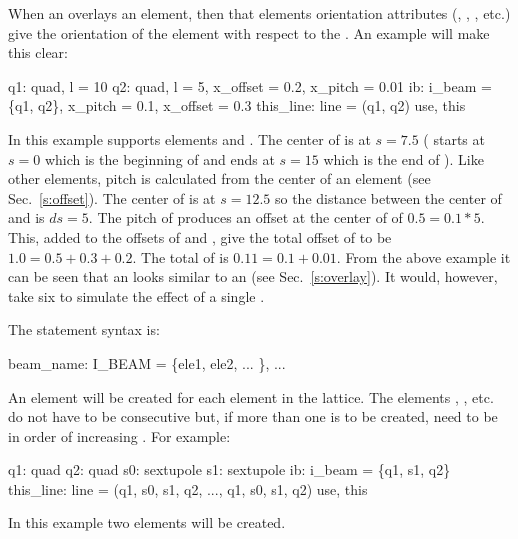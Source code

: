 When an  overlays an element, then that elements
orientation attributes (, , , etc.) 
give the orientation of
the element with respect to the . An example will make this clear:
\begin{example}
  q1: quad, l = 10
  q2: quad, l = 5, x_offset = 0.2, x_pitch = 0.01
  ib: i_beam = \{q1, q2\}, x_pitch = 0.1, x_offset = 0.3
  this_line: line = (q1, q2)
  use, this
\end{example}
In this example  supports elements  and . The
center of  is at $s = 7.5$ ( starts at $s = 0$ which is
the beginning of  and ends at $s = 15$ which is the end of
). Like other elements, pitch is calculated from the center of
an  element (see Sec.~\ref{s:offset}). The center of
 is at $s = 12.5$ so the distance between the center of 
and  is $ds = 5$. The pitch of  produces an offset at
the center of  of $0.5 = 0.1 * 5$. This, added to the offsets
of  and , give the total offset of  to be $1.0 =
0.5 + 0.3 + 0.2$. The total  of  is $0.11 = 0.1 +
0.01$. From the above example it can be seen that an  looks
similar to an  (see Sec.~\ref{s:overlay}). It would,
however, take six  to simulate the effect of a single
.

The  statement syntax is:
\begin{example}
  beam_name: I_BEAM = \{ele1, ele2, ... \}, ...
\end{example}
An  element will be created for each  element in
the lattice. The elements , , etc. do not have to be
consecutive but, if more than one  is to be created, need
to be in order of increasing .
For example:
\begin{example}
  q1: quad
  q2: quad
  s0: sextupole
  s1: sextupole
  ib: i_beam = \{q1, s1, q2\}
  this_line: line = (q1, s0, s1, q2, ..., q1, s0, s1, q2)
  use, this
\end{example}
In this example two  elements will be created.

